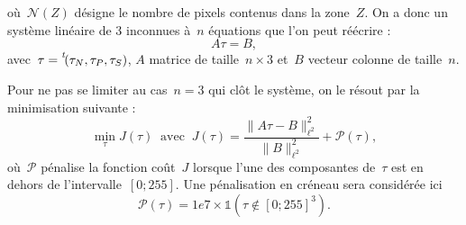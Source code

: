 \documentclass[main.tex]{subfiles}
\begin{document}
où~$\mathcal{N}(Z)$ désigne le nombre de pixels contenus dans la zone~$Z$. On a donc un système linéaire de 3 inconnues à~$n$ équations que l'on peut réécrire :
\begin{equation} \label{eq:Atau_egal_B}
A\tau=B,
\end{equation}
avec~$\tau= \prescript{\mathit{t\!}}{}{(}\tau_N,\tau_P,\tau_S)$, $A$ matrice de taille~$n\times 3$ et~$B$ vecteur colonne de taille~$n$.

Pour ne pas se limiter au cas~$n=3$ qui clôt le système, on le résout par la minimisation suivante :
\begin{equation}\label{eq:min_optim_grey}
\min_{\tau} J(\tau) \ \textrm{ avec } \ J(\tau)= \dfrac{\| A\tau - B \|^2_{\ell^2}}{\|B\|^2_{\ell^2}} + \mathcal{P}(\tau),
\end{equation}
où~$\mathcal{P}$ pénalise la fonction coût~$J$ lorsque l'une des composantes de~$\tau$ est en dehors de l'intervalle~$[0;255]$. 
Une pénalisation en créneau sera considérée ici
\begin{equation}
\label{eq:penalisation_creneau}
\mathcal{P}(\tau) = 1e7 \times\mathds{1}( \tau \notin  [0;255]^3 ).
\end{equation}
\end{document}
